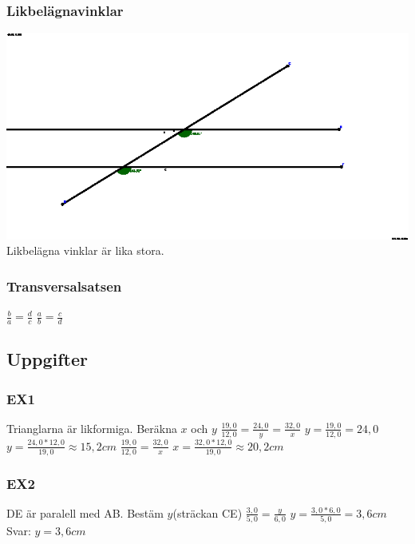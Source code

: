 \documentclass[a4paper,10pt]{article}
\begin{document}
\begin{flushleft}
    \subsubsection{Likbelägnavinklar}
      \includegraphics{likbelagna.eps}\newline
      Likbelägna vinklar är lika stora.
    \subsubsection{Transversalsatsen}
      $ \frac{b}{a} = \frac{d}{c} $
      $ \frac{a}{b} = \frac{c}{d} $\newline
  \subsection{Uppgifter}
    \subsubsection{EX1}
      Trianglarna är likformiga. Beräkna $x$ och $y$
      $ \frac{19,0}{12,0} = \frac{24,0}{y} = \frac{32,0}{x} $\newline
      $ y = \frac{19,0}{12,0} = 24,0 $\newline
      $ y = \frac{24,0*12,0}{19,0}\approx15,2cm $\newline
      $ \frac{19,0}{12,0} = \frac{32,0}{x} $\newline
      $ x = \frac{32,0*12,0}{19,0}\approx20,2cm $\newline
    \subsubsection{EX2}
      DE är paralell med AB. Bestäm $y$(sträckan CE)
      $ \frac{3,0}{5,0} = \frac{y}{6,0} $\newline
      $ y = \frac{3,0*6,0}{5,0} = 3,6cm$\newline
      Svar: $ y = 3,6cm $

\end{flushleft}
\end{document}

